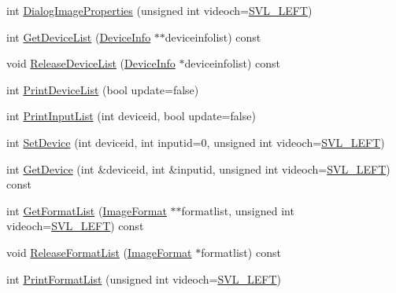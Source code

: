 \begin{DoxyCompactItemize}
\item 
int \hyperlink{classsvl_filter_source_video_capture_a7555805bed43a6cc640d0c393115e3b6}{Dialog\-Image\-Properties} (unsigned int videoch=\hyperlink{svl_definitions_8h_ab9fec7615f19c8df2919eebcab0b187f}{S\-V\-L\-\_\-\-L\-E\-F\-T})
\item 
int \hyperlink{classsvl_filter_source_video_capture_a21cb6cab9a30f845f15072fbb18d7380}{Get\-Device\-List} (\hyperlink{classsvl_filter_source_video_capture_ad656487fb2deec890dc39764152b8f8b}{Device\-Info} $\ast$$\ast$deviceinfolist) const 
\item 
void \hyperlink{classsvl_filter_source_video_capture_acc6ebb12708759516814f721fb1f71e1}{Release\-Device\-List} (\hyperlink{classsvl_filter_source_video_capture_ad656487fb2deec890dc39764152b8f8b}{Device\-Info} $\ast$deviceinfolist) const 
\item 
int \hyperlink{classsvl_filter_source_video_capture_ac898139251c6c708cd17822a794f63f7}{Print\-Device\-List} (bool update=false)
\item 
int \hyperlink{classsvl_filter_source_video_capture_a8c89ca74d3499711f6c6dcd6bdb36be6}{Print\-Input\-List} (int deviceid, bool update=false)
\item 
int \hyperlink{classsvl_filter_source_video_capture_aebf3b0b1b3c9ef04c20db692d7253256}{Set\-Device} (int deviceid, int inputid=0, unsigned int videoch=\hyperlink{svl_definitions_8h_ab9fec7615f19c8df2919eebcab0b187f}{S\-V\-L\-\_\-\-L\-E\-F\-T})
\item 
int \hyperlink{classsvl_filter_source_video_capture_a48d8ab9fc28c745aa66d41236f8a9e93}{Get\-Device} (int \&deviceid, int \&inputid, unsigned int videoch=\hyperlink{svl_definitions_8h_ab9fec7615f19c8df2919eebcab0b187f}{S\-V\-L\-\_\-\-L\-E\-F\-T}) const 
\item 
int \hyperlink{classsvl_filter_source_video_capture_aaeaf902a2fb7ac3884627bece1582909}{Get\-Format\-List} (\hyperlink{classsvl_filter_source_video_capture_a0944cc8abe4240701683128c28fa5349}{Image\-Format} $\ast$$\ast$formatlist, unsigned int videoch=\hyperlink{svl_definitions_8h_ab9fec7615f19c8df2919eebcab0b187f}{S\-V\-L\-\_\-\-L\-E\-F\-T}) const 
\item 
void \hyperlink{classsvl_filter_source_video_capture_ab6665993a38e11a5357df6087e29fa0b}{Release\-Format\-List} (\hyperlink{classsvl_filter_source_video_capture_a0944cc8abe4240701683128c28fa5349}{Image\-Format} $\ast$formatlist) const 
\item 
int \hyperlink{classsvl_filter_source_video_capture_abb0305cbcc53b3aad08fb5f9e1071bbb}{Print\-Format\-List} (unsigned int videoch=\hyperlink{svl_definitions_8h_ab9fec7615f19c8df2919eebcab0b187f}{S\-V\-L\-\_\-\-L\-E\-F\-T})

\end{DoxyCompactItemize}
